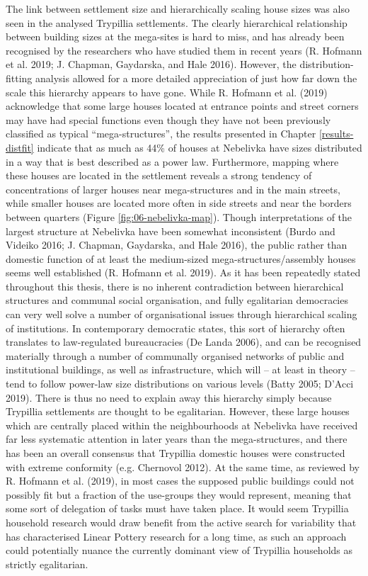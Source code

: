 \documentclass[
  12pt,
  a4paper, twoside]{book}
\begin{document}
The link between settlement size and hierarchically scaling house sizes was also seen in the analysed Trypillia settlements. The clearly hierarchical relationship between building sizes at the mega-sites is hard to miss, and has already been recognised by the researchers who have studied them in recent years (R. Hofmann et al. 2019; J. Chapman, Gaydarska, and Hale 2016). However, the distribution-fitting analysis allowed for a more detailed appreciation of just how far down the scale this hierarchy appears to have gone. While R. Hofmann et al. (2019) acknowledge that some large houses located at entrance points and street corners may have had special functions even though they have not been previously classified as typical ``mega-structures'', the results presented in Chapter \ref{results-distfit} indicate that as much as 44\% of houses at Nebelivka have sizes distributed in a way that is best described as a power law. Furthermore, mapping where these houses are located in the settlement reveals a strong tendency of concentrations of larger houses near mega-structures and in the main streets, while smaller houses are located more often in side streets and near the borders between quarters (Figure \ref{fig:06-nebelivka-map}). Though interpretations of the largest structure at Nebelivka have been somewhat inconsistent (Burdo and Videiko 2016; J. Chapman, Gaydarska, and Hale 2016), the public rather than domestic function of at least the medium-sized mega-structures/assembly houses seems well established (R. Hofmann et al. 2019). As it has been repeatedly stated throughout this thesis, there is no inherent contradiction between hierarchical structures and communal social organisation, and fully egalitarian democracies can very well solve a number of organisational issues through hierarchical scaling of institutions. In contemporary democratic states, this sort of hierarchy often translates to law-regulated bureaucracies (De Landa 2006), and can be recognised materially through a number of communally organised networks of public and institutional buildings, as well as infrastructure, which will -- at least in theory -- tend to follow power-law size distributions on various levels (Batty 2005; D'Acci 2019). There is thus no need to explain away this hierarchy simply because Trypillia settlements are thought to be egalitarian. However, these large houses which are centrally placed within the neighbourhoods at Nebelivka have received far less systematic attention in later years than the mega-structures, and there has been an overall consensus that Trypillia domestic houses were constructed with extreme conformity (e.g. Chernovol 2012). At the same time, as reviewed by R. Hofmann et al. (2019), in most cases the supposed public buildings could not possibly fit but a fraction of the use-groups they would represent, meaning that some sort of delegation of tasks must have taken place. It would seem Trypillia household research would draw benefit from the active search for variability that has characterised Linear Pottery research for a long time, as such an approach could potentially nuance the currently dominant view of Trypillia households as strictly egalitarian.
\end{document}

